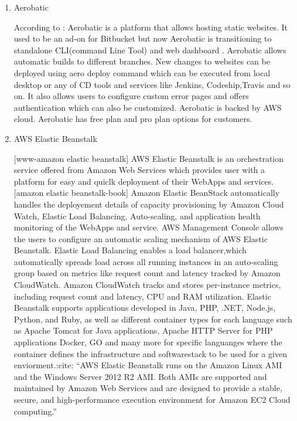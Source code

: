 \begin{enumerate}
\item {} 
Aerobatic

According to \label{\detokenize{i524/technologies:id170}}{\hyperref[\detokenize{i524/technologies:www-aero}]{\sphinxcrossref{{[}148{]}}}}: Aerobatic is a platform that allows
hosting static websites. It used to be an ad-on for Bitbucket but
now Aerobatic is transitioning to standalone CLI(command Line
Tool) and web dashboard . Aerobatic allows automatic builds to
different branches. New changes to websites can be deployed using
aero deploy command which can be executed from local desktop or
any of CD tools and services like Jenkins, Codeship,Travis and so
on.  It also allows users to configure custom error pages and
offers authentication which can also be customized. Aerobatic is
backed by AWS cloud. Aerobatic has free plan and pro plan options
for customers.

\item {} 
AWS Elastic Beanstalk

{[}www-amazon elastic beanstalk{]} AWS Elastic Beanstalk is an
orchestration service offered from Amazon Web Services which
provides user with a platform for easy and quiclk deployment of
their WebApps and services. {[}amazon elastic beanstalk-book{]}
Amazon Elastic BeanStack automatically handles the deployement
details of capacity provisioning by Amazon Cloud Watch, Elastic
Load Balancing, Auto-scaling, and application health monitoring of
the WebApps and service. AWS Management Console allows the users
to configure an automatic scaling mechanism of AWS Elastic
Beanstalk. Elastic Load Balancing enables a load balancer,which
automatically spreads load across all running instances in an
auto-scaling group based on metrics like request count and latency
tracked by Amazon CloudWatch. Amazon CloudWatch tracks and stores
per-instance metrics, including request count and latency, CPU and
RAM utilization. Elastic Beanstalk supports applications developed
in Java, PHP, .NET, Node.js, Python, and Ruby, as well as
different container types for each language such as Apache Tomcat
for Java applications, Apache HTTP Server for PHP applications
Docker, GO and many more for specific languanges where the
container defines the infrastructure and softwarestack to be used
for a given enviorment.:cite: ``AWS
Elastic Beanstalk runs on the Amazon Linux AMI and the Windows
Server 2012 R2 AMI. Both AMIs are supported and maintained by
Amazon Web Services and are designed to provide a stable, secure,
and high-performance execution environment for Amazon EC2 Cloud
computing.''


\end{enumerate}
